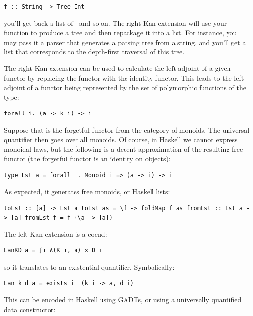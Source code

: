 \begin{verbatim}
f :: String -> Tree Int
\end{verbatim}

you'll get back a list of , and so on. The right Kan
extension will use your function to produce a tree and then repackage it
into a list. For instance, you may pass it a parser that generates a
parsing tree from a string, and you'll get a list that corresponds to
the depth-first traversal of this tree.

The right Kan extension can be used to calculate the left adjoint of a
given functor by replacing the functor  with the identity
functor. This leads to the left adjoint of a functor  being
represented by the set of polymorphic functions of the type:

\begin{verbatim}
forall i. (a -> k i) -> i
\end{verbatim}

Suppose that  is the forgetful functor from the category of
monoids. The universal quantifier then goes over all monoids. Of course,
in Haskell we cannot express monoidal laws, but the following is a
decent approximation of the resulting free functor (the forgetful
functor  is an identity on objects):

\begin{verbatim}
type Lst a = forall i. Monoid i => (a -> i) -> i
\end{verbatim}

As expected, it generates free monoids, or Haskell lists:

\begin{verbatim}
toLst :: [a] -> Lst a toLst as = \f -> foldMap f as fromLst :: Lst a -> [a] fromLst f = f (\a -> [a])
\end{verbatim}

The left Kan extension is a coend:

\begin{verbatim}
LanKD a = ∫i A(K i, a) × D i
\end{verbatim}

so it translates to an existential quantifier. Symbolically:

\begin{verbatim}
Lan k d a = exists i. (k i -> a, d i)
\end{verbatim}

This can be encoded in Haskell using GADTs, or using a universally
quantified data constructor:

